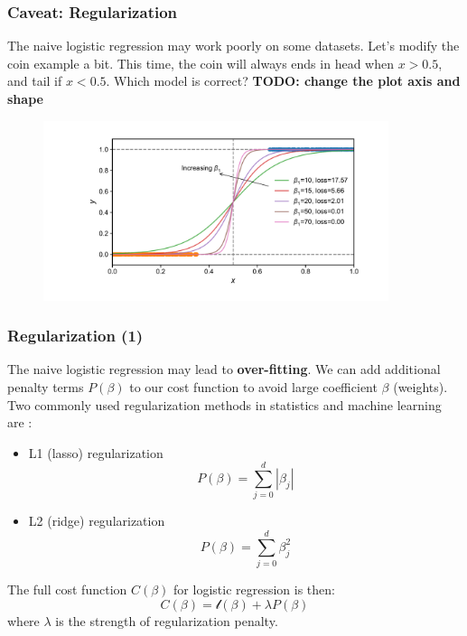 \documentclass[10pt,aspectratio=169]{beamer}
\begin{document}
      \begin{frame}
        \frametitle{Caveat: Regularization}
        
        The naive logistic regression may work poorly on some
        datasets.  Let's modify the coin example a bit. This time, the
        coin will always ends in head when $x > 0.5$, and tail if
        $x < 0.5$. Which model is correct?  \textbf{TODO: change the
          plot axis and shape}

        \begin{figure}[t]
          \vspace{-1em}
          \includegraphics[width=0.90\textwidth]{scripts/perfect_sep.pdf}
        \end{figure}
        
      \end{frame}

      \begin{frame}
        \frametitle{Regularization (1)}

        The naive logistic regression may lead to
        \textbf{over-fitting}.  We can add additional penalty terms
        $P(\beta)$ to our cost function to avoid large coefficient
        $\beta$ (weights). Two commonly used regularization methods in
        statistics and machine learning
        are \let\thefootnote\relax{}:

        \begin{itemize}
        \item L1 (lasso) regularization
          \begin{equation*}
            P(\beta) = \sum_{j=0}^{d} |\beta_{j}| 
          \end{equation*}

          
        \item L2 (ridge) regularization
          \begin{equation*}
            P(\beta) = \sum_{j=0}^{d} \beta_{j}^{2}
          \end{equation*}
        \end{itemize}

        The full cost function $C(\beta)$ for logistic regression is
        then:
        \begin{equation*}
          C(\beta) = \mathscr{l}(\beta) + \lambda P(\beta)
        \end{equation*}
        where $\lambda$ is the strength of regularization penalty.
      \end{frame}
\end{document}
